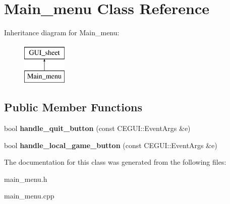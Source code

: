 \hypertarget{class_main__menu}{
\section{Main\_\-menu Class Reference}
\label{class_main__menu}
}
Inheritance diagram for Main\_\-menu:\begin{figure}[H]
\begin{center}
\leavevmode
\includegraphics[height=2.000000cm]{class_main__menu}
\end{center}
\end{figure}
\subsection*{Public Member Functions}
\begin{DoxyCompactItemize}
\item 
\hypertarget{class_main__menu_ac63418719c9bd05847b853e22e0974ac}{
bool {\bfseries handle\_\-quit\_\-button} (const CEGUI::EventArgs \&e)}
\label{class_main__menu_ac63418719c9bd05847b853e22e0974ac}

\item 
\hypertarget{class_main__menu_a2c1e8d2259846a68aaa49135690d96f1}{
bool {\bfseries handle\_\-local\_\-game\_\-button} (const CEGUI::EventArgs \&e)}
\label{class_main__menu_a2c1e8d2259846a68aaa49135690d96f1}

\end{DoxyCompactItemize}


The documentation for this class was generated from the following files:\begin{DoxyCompactItemize}
\item 
main\_\-menu.h\item 
main\_\-menu.cpp\end{DoxyCompactItemize}
